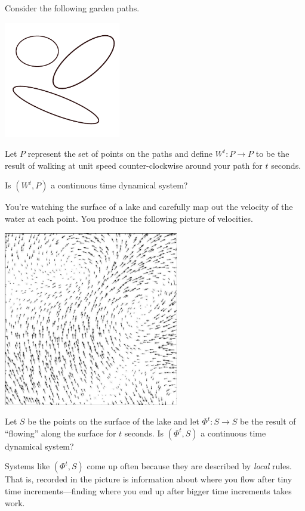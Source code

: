	\newpage
	\question
	\begin{parts}
		\item 

		Consider the following garden paths.
		\begin{center}
			\includegraphics[width=2in]{images/garden-path.pdf}
		\end{center}
		Let $P$ represent the set of points on the paths and define $W^t:P\to P$ to be the result of walking
		at unit speed counter-clockwise around your path for $t$ seconds.

			Is $(W^t,P)$ a continuous time dynamical system?

		\item You're watching the surface of a lake and carefully map out the velocity of the
			water at each point. You produce the following picture of velocities.
		\begin{center}
			\includegraphics[width=3in]{images/vectorfield1.jpg}
		\end{center}
			Let $S$ be the points on the surface of the lake and let $\Phi^t:S\to S$ be the result
			of ``flowing'' along the surface for $t$ seconds. Is $(\Phi^t, S)$ a continuous time dynamical system?
	\end{parts}

	Systems like $(\Phi^t,S)$ come up often because they are described by \emph{local} rules. That is, recorded in the
	picture is information about where you flow after tiny time increments---finding where you end up after bigger time
	increments takes work.

